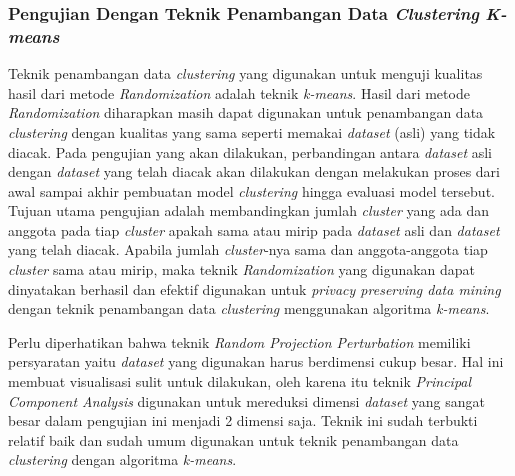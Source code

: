 \subsubsection{Pengujian Dengan Teknik Penambangan Data \textit{Clustering} \textit{K-means}}
\label{subsubsec:analisis-kmeans}

Teknik penambangan data \textit{clustering} yang digunakan untuk menguji kualitas hasil dari metode \textit{Randomization} adalah teknik \textit{k-means}. Hasil dari metode \textit{Randomization} diharapkan masih dapat digunakan untuk penambangan data \textit{clustering} dengan kualitas yang sama seperti memakai \textit{dataset} (asli) yang tidak diacak. Pada pengujian yang akan dilakukan, perbandingan antara \textit{dataset} asli dengan \textit{dataset} yang telah diacak akan dilakukan dengan melakukan proses dari awal sampai akhir pembuatan model \textit{clustering} hingga evaluasi model tersebut. Tujuan utama pengujian adalah membandingkan jumlah \textit{cluster} yang ada dan anggota pada tiap \textit{cluster} apakah sama atau mirip pada \textit{dataset} asli dan \textit{dataset} yang telah diacak. Apabila jumlah \textit{cluster}-nya sama dan anggota-anggota tiap \textit{cluster} sama atau mirip, maka teknik \textit{Randomization} yang digunakan dapat dinyatakan berhasil dan efektif digunakan untuk \textit{privacy preserving data mining} dengan teknik penambangan data \textit{clustering} menggunakan algoritma \textit{k-means}.

Perlu diperhatikan bahwa teknik \textit{Random Projection Perturbation} memiliki persyaratan yaitu \textit{dataset} yang digunakan harus berdimensi cukup besar. Hal ini membuat visualisasi sulit untuk dilakukan, oleh karena itu teknik \textit{Principal Component Analysis} digunakan untuk mereduksi dimensi \textit{dataset} yang sangat besar dalam pengujian ini menjadi 2 dimensi saja. Teknik ini sudah terbukti relatif baik dan sudah umum digunakan untuk teknik penambangan data \textit{clustering} dengan algoritma \textit{k-means}.

